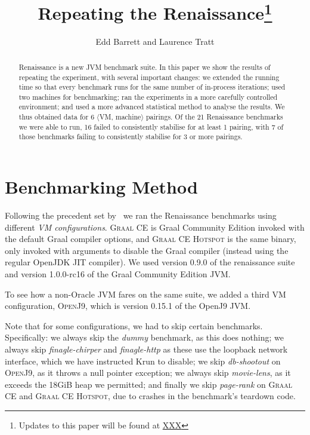 \documentclass[a4paper]{article}
\newcommand{\graalce}{\textsc{Graal CE}\xspace}
\newcommand{\graalcehs}{\textsc{Graal CE Hotspot}\xspace}
\newcommand{\jnine}{\textsc{OpenJ9}\xspace}
\begin{document}
\title{Repeating the Renaissance\footnote{Updates to this paper will be found at \url{XXX}}}

\author{Edd Barrett and Laurence Tratt}

\maketitle

\begin{abstract}
Renaissance is a new JVM benchmark suite. In this paper we show the results of
repeating the experiment, with several important changes: we extended the
running time so that every benchmark runs for the same number of in-process
iterations; used two machines for benchmarking; ran the experiments in a more
carefully controlled environment; and used a more advanced statistical method
to analyse the results. We thus obtained data for 6 $\langle$VM, machine$\rangle$ pairings. Of the
21 Renaissance benchmarks we were able to run, 16 failed to consistently
stabilise for at least 1 pairing, with 7 of those benchmarks failing to
consistently stabilise for 3 or more pairings.
\end{abstract}

\section{Benchmarking Method}
\label{sec:eval}

Following the precedent set by~\cite{prokopec19renaissance} we ran the
Renaissance benchmarks using different \emph{VM configurations}. \graalce is
Graal Community Edition invoked with the default Graal compiler options, and
\graalcehs is the same binary, only invoked with arguments to disable the Graal
compiler (instead using the regular OpenJDK JIT compiler). We used version 0.9.0
of the renaissance suite and version 1.0.0-rc16 of the Graal Community
Edition JVM.

To see how a non-Oracle JVM fares on the same suite, we added a third VM
configuration, \jnine, which is version 0.15.1 of the OpenJ9 JVM.

Note that for some configurations, we had to skip certain benchmarks.
Specifically: we always skip the \emph{dummy} benchmark, as this does nothing;
we always skip \emph{finagle-chirper} and \emph{finagle-http} as these use the
loopback network interface, which we have instructed Krun to disable; we skip
\emph{db-shootout} on \jnine, as it throws a null pointer exception; we always
skip \emph{movie-lens}, as it exceeds the 18GiB heap we permitted; and finally
we skip \emph{page-rank} on \graalce and \graalcehs, due to crashes in the
benchmark's teardown code.
\end{document}
